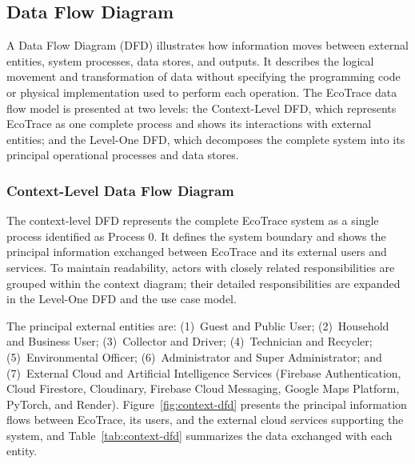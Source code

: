\subsection{Data Flow Diagram}

A Data Flow Diagram (DFD) illustrates how information moves between
external entities, system processes, data stores, and outputs. It describes the
logical movement and transformation of data without specifying the
programming code or physical implementation used to perform each
operation. The EcoTrace data flow model is presented at two levels: the
Context-Level DFD, which represents EcoTrace as one complete process and
shows its interactions with external entities; and the Level-One DFD, which
decomposes the complete system into its principal operational processes and
data stores.

\subsubsection{Context-Level Data Flow Diagram}

The context-level DFD represents the complete EcoTrace system as a single
process identified as Process 0. It defines the system boundary and shows the
principal information exchanged between EcoTrace and its external users and
services. To maintain readability, actors with closely related responsibilities
are grouped within the context diagram; their detailed responsibilities are
expanded in the Level-One DFD and the use case model.

The principal external entities are: (1)~Guest and Public User;
(2)~Household and Business User; (3)~Collector and Driver; (4)~Technician
and Recycler; (5)~Environmental Officer; (6)~Administrator and Super
Administrator; and (7)~External Cloud and Artificial Intelligence Services
(Firebase Authentication, Cloud Firestore, Cloudinary, Firebase Cloud
Messaging, Google Maps Platform, PyTorch, and Render).
Figure~\ref{fig:context-dfd} presents the principal information flows between
EcoTrace, its users, and the external cloud services supporting the system, and
Table~\ref{tab:context-dfd} summarizes the data exchanged with each entity.

